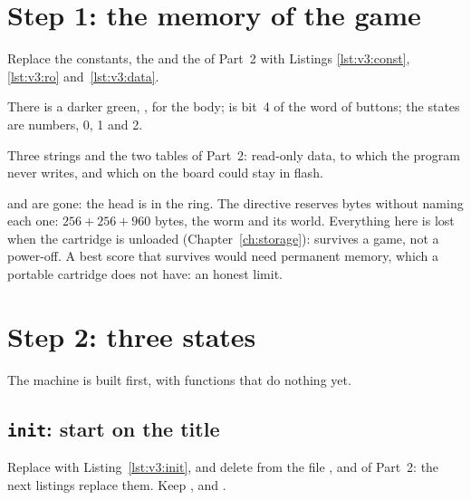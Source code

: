 \section{Step 1: the memory of the game}

Replace the constants, the  and the  of Part~2 with
Listings \ref{lst:v3:const}, \ref{lst:v3:ro} and~\ref{lst:v3:data}.


There is a darker green, , for the body;  is bit~4 of
the word of buttons; the states are numbers, 0, 1 and 2.


Three strings and the two tables of Part~2: read-only data, to which the
program never writes, and which on the board could stay in flash.


 and  are gone: the head is in the ring. The
directive  reserves bytes without naming each one:
$256+256+960$ bytes, the worm and its world. Everything here is lost when the
cartridge is unloaded (Chapter~\ref{ch:storage}):  survives a game,
not a power-off. A best score that survives would need permanent memory,
which a portable cartridge does not have: an honest limit.

\section{Step 2: three states}

The machine is built first, with functions that do nothing yet.

\subsection{\texttt{init}: start on the title}

Replace  with Listing~\ref{lst:v3:init}, and delete from
the file ,  and  of Part~2:
the next listings replace them. Keep , 
and .

